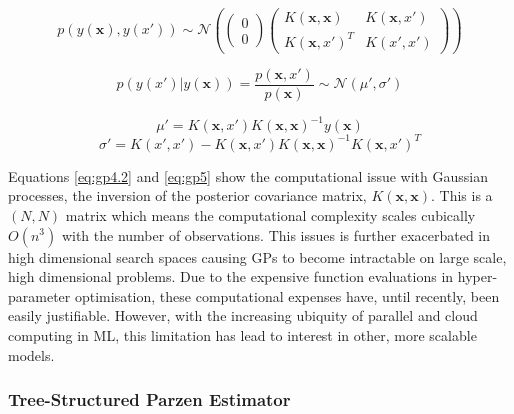 			\begin{equation}
			\label{eq:gp4} p(y(\bm{x}),y(x')) \sim \mathcal{N} \left(\begin{pmatrix}
			0\\
			0
			\end{pmatrix}
			\begin{pmatrix} K(\bm{x} , \bm{x}) & K(\bm{x},x')\\
							K(\bm{x},x')^T &  K(x',x')
			\end{pmatrix}\right)\end{equation}



			\begin{equation}\label{eq:gp4.1}p(y(x')|y(\bm{x})) = \frac{p(\bm{x},x')}{p(\bm{x})} \sim  \mathcal{N} (\mu',\sigma') \end{equation}



			\begin{equation}\label{eq:gp4.2}\mu' = K(\bm{x},x')K(\bm{x},\bm{x})^{-1}y(\bm{x})\end{equation}
			\begin{equation} \label{eq:gp5}\sigma' = K(x',x') - K(\bm{x},x')K(\bm{x},\bm{x})^{-1}K(\bm{x},x')^T \end{equation}



			Equations \ref{eq:gp4.2} and \ref{eq:gp5} show the computational issue with Gaussian processes, the inversion of the posterior covariance matrix, \(K(\bm{x},\bm{x})\). This is a \((N,N)\) matrix which means the computational complexity scales cubically \(O(n^3)\) with the number of observations. This issues is further exacerbated in high dimensional search spaces causing GPs to become intractable on large scale, high dimensional problems. Due to the expensive function evaluations in hyper-parameter optimisation, these computational expenses have, until recently, been easily justifiable. However, with the increasing ubiquity of parallel and cloud computing in ML, this limitation has lead to interest in other, more scalable models.


		\subsubsection{Tree-Structured Parzen Estimator}

